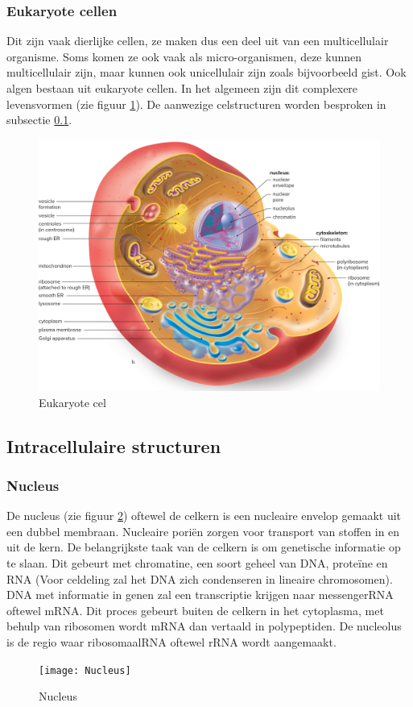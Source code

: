 \documentclass[a4paper,kul]{kulakarticle} %
\begin{document}
\subsubsection{Eukaryote cellen}
Dit zijn vaak dierlijke cellen, ze maken dus een deel uit van een multicellulair organisme. Soms komen ze ook vaak als micro-organismen, deze kunnen multicellulair zijn, maar kunnen ook unicellulair zijn zoals bijvoorbeeld gist. Ook algen bestaan uit eukaryote cellen. In het algemeen zijn dit complexere levensvormen (zie figuur \ref{fig:eukaryotecel}). De aanwezige celstructuren worden besproken in subsectie \ref{sec:IntracellulaireStructuren}. 
\begin{figure}[h]
	\centering
	\includegraphics[width=0.5\linewidth]{Eukaryote_cel}
	\caption[Eukaryote cel]{Eukaryote cel}
	\label{fig:eukaryotecel}
\end{figure}

\subsection{Intracellulaire structuren}
\label{sec:IntracellulaireStructuren}
\subsubsection{Nucleus}
De nucleus (zie figuur \ref{fig:nucleus}) oftewel de celkern is een nucleaire envelop gemaakt uit een dubbel membraan. Nucleaire poriën zorgen voor transport van stoffen in en uit de kern. De belangrijkste taak van de celkern is om genetische informatie op te slaan. Dit gebeurt met chromatine, een soort geheel van DNA, proteïne en RNA (Voor celdeling zal het DNA zich condenseren in lineaire chromosomen). DNA met informatie in genen zal een transcriptie krijgen naar messengerRNA oftewel mRNA. Dit proces gebeurt buiten de celkern in het cytoplasma, met behulp van ribosomen wordt mRNA dan vertaald in polypeptiden. De nucleolus is de regio waar ribosomaalRNA oftewel rRNA wordt aangemaakt.
\begin{figure}[h]
	\centering
	\texttt{[image: Nucleus]}
	\caption[Nucleus]{Nucleus}
	\label{fig:nucleus}
\end{figure}
\end{document}
